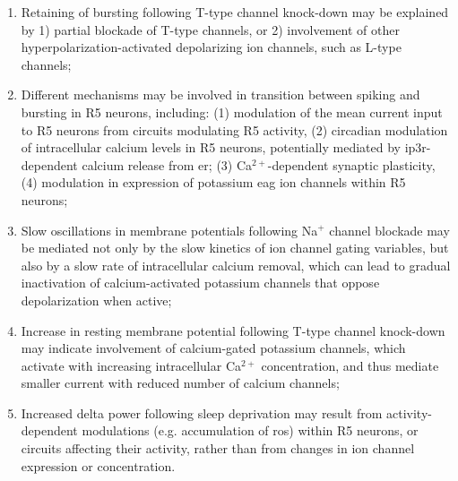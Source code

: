 \documentclass[../main.tex]{subfiles}
\begin{document}
\begin{enumerate}
    \item Retaining of bursting following T-type channel knock-down may be explained by 1) partial blockade of T-type channels, or 2) involvement of other hyperpolarization-activated depolarizing ion channels, such as L-type channels;
    
    \item Different mechanisms may be involved in transition between spiking and bursting in R5 neurons, including: (1) modulation of the mean current input to R5 neurons from circuits modulating R5 activity, (2) circadian modulation of intracellular calcium levels in R5 neurons, potentially mediated by \gls{ip3r}-dependent calcium release from \gls{er}; (3) Ca$^{2+}$-dependent synaptic plasticity, (4) modulation in expression of potassium \gls{eag} ion channels within R5 neurons;
    
    \item Slow oscillations in membrane potentials following Na$^+$ channel blockade may be mediated not only by the slow kinetics of ion channel gating variables, but also by a slow rate of intracellular calcium removal, which can lead to gradual inactivation of calcium-activated potassium channels that oppose depolarization when active;

    \item Increase in resting membrane potential following T-type channel knock-down may indicate involvement of calcium-gated potassium channels, which activate with increasing intracellular Ca$^{2+}$ concentration, and thus mediate smaller current with reduced number of calcium channels;
    
    \item Increased delta power following sleep deprivation may result from activity-dependent modulations (e.g. accumulation of \gls{ros}) within R5 neurons, or circuits affecting their activity, rather than from changes in ion channel expression or concentration.
    
    
\end{enumerate}
\end{document}
